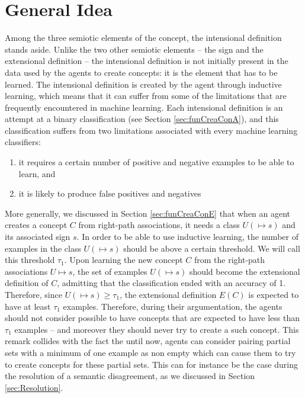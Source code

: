 \section{General Idea}
\label{sec:DoGGenIdea}

Among the three semiotic elements of the concept, the intensional definition stands aside. Unlike the two other semiotic elements -- the sign and the extensional definition -- the intensional definition is not initially  present in the data used by the agents to create concepts: it is the element that has to be learned. The intensional definition is created by the agent through inductive learning, which means that it can suffer from some of the limitations that are frequently encountered in machine learning. Each intensional definition is an attempt at a binary classification (see Section \ref{sec:funCreaConA}), and this classification suffers from two limitations associated with every machine learning classifiers:

\begin{enumerate}
    \item it requires a certain number of positive and negative examples to be able to learn, and
    \item it is likely to produce false positives and negatives
\end{enumerate}


More generally, we discussed in Section \ref{sec:funCreaConE} that when an agent creates a concept $C$ from right-path associations, it needs a class $U(\mapsto s)$ and its associated sign $s$. In order to be able to use inductive learning, the number of examples in the class $U(\mapsto s)$ should be above a certain threshold. We will call this threshold $\tau_{1}$. Upon learning the new concept $C$ from the right-path associations $U \mapsto s$, the set of examples $U(\mapsto s)$ should become the extensional definition of $C$, admitting that the classification ended with an accuracy of 1. Therefore, since $U(\mapsto s) \geq \tau_{1}$, the extensional definition $E(C)$ is expected to have at least $\tau_{1}$ examples. Therefore, during their argumentation, the agents should not consider possible to have concepts that are expected to have less than $\tau_{1}$ examples -- and moreover they should never try to create a such concept. This remark collides with the fact the until now, agents can consider pairing partial sets with a minimum of one example as non empty which can cause them to try to create concepts for these partial sets. This can for instance be the case during the resolution of a semantic disagreement, as we discussed in Section \ref{sec:Resolution}.

